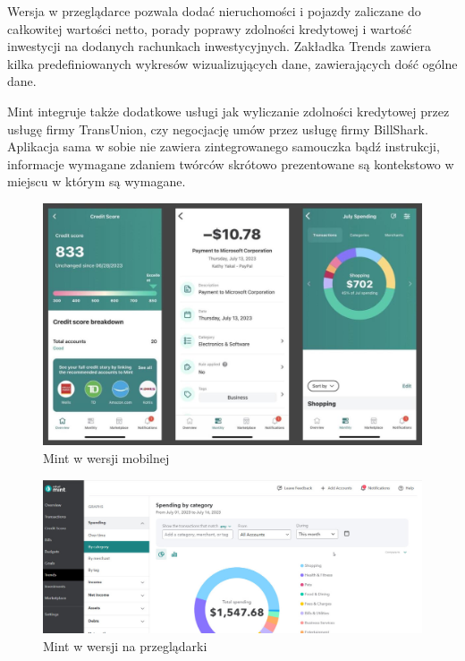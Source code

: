 \documentclass[a4paper,10pt, twoside]{report}
\begin{document}
\begin{large}
{Wersja w przeglądarce pozwala dodać nieruchomości i pojazdy zaliczane do 
całkowitej wartości netto, porady poprawy zdolności kredytowej i wartość 
inwestycji na dodanych rachunkach inwestycyjnych. Zakładka Trends zawiera 
kilka predefiniowanych wykresów wizualizujących dane, zawierających dość ogólne 
dane.}

{Mint integruje także dodatkowe usługi jak wyliczanie zdolności kredytowej przez 
usługę firmy TransUnion, czy negocjację umów przez usługę firmy BillShark. 
Aplikacja sama w sobie nie zawiera zintegrowanego samouczka bądź instrukcji, 
informacje wymagane zdaniem twórców skrótowo prezentowane są kontekstowo w miejscu w 
którym są wymagane.}

\begin{figure}[H]           %
    \centering
    \includegraphics[width=12cm]{figures/pcmag_mintmobile_05OMSsUmroXJ6F6sETKpH9R-50.fit_lim.size_1152x.jpg}
    \caption{Mint w wersji mobilnej}
    \label{mintmobile}
\end{figure}

\begin{figure}[H]           %
    \centering
    \includegraphics[width=12cm]{figures/pcmag_mintweb_05OMSsUmroXJ6F6sETKpH9R-51.fit_lim.size_1152x.jpg}
    \caption{Mint w wersji na przeglądarki}
    \label{fig:mintweb}
\end{figure}


\end{large}
\end{document}
